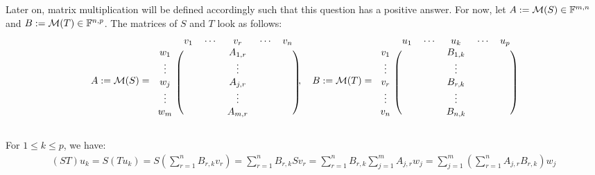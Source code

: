 Later on, matrix multiplication will be defined accordingly such that this question has a positive answer.
For now, let $A := \mathcal{M}(S)\in \mathbb{F}^{m,n}$ and $B := \mathcal{M}(T)\in \mathbb{F}^{n,p}$. The matrices of $S$ and $T$ look as follows:
\begin{equation}
  A := \mathcal{M} (S) =
  \begin{blockarray}{cccccc}
    & v_1 & \cdots & v_r     & \cdots & v_n \\
    \begin{block}{c(ccccc)}
      w_1    &     &        & A_{1,r} &        &     \\
      \vdots &     &        & \vdots  &        &     \\
      w_j    &     &        & A_{j,r} &        &     \\
      \vdots &     &        & \vdots  &        &     \\
      w_m    &     &        & A_{m,r} &        &     \\
    \end{block}
  \end{blockarray},
  \quad
  B := \mathcal{M} (T) =
  \begin{blockarray}{cccccc}
    & u_1 & \cdots & u_k     & \cdots & u_p \\
    \begin{block}{c(ccccc)}
      v_1    &     &        & B_{1,k} &        &     \\
      \vdots &     &        & \vdots  &        &     \\
      v_r    &     &        & B_{r,k} &        &     \\
      \vdots &     &        & \vdots  &        &     \\
      v_n    &     &        & B_{n,k} &        &     \\
    \end{block}
  \end{blockarray}
\end{equation}

For $1 \leq k \leq p$, we have:
\begin{equation}
  \begin{aligned}
    (ST) u_k
    = S (Tu_k)
    = S \left ( \sum_{r=1}^{n} B_{r,k} v_r \right )
    =  \sum_{r=1}^{n} B_{r,k} S v_r
    =  \sum_{r=1}^{n} B_{r,k} \sum_{j=1}^{m} A_{j,r}  w_j
    =  \sum_{j=1}^{m} \left( \sum_{r=1}^{n} A_{j,r}  B_{r,k} \right) w_j
  \end{aligned}
\end{equation}

